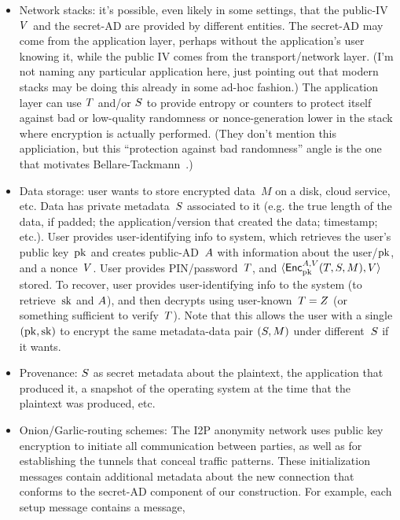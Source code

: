 \begin{itemize}
%
\item Network stacks: it's possible, even likely in some settings, that the public-IV~$V$ and the secret-AD are provided by different entities.  The secret-AD may come from the application layer, perhaps without the application's user knowing it, while the public IV comes from the transport/network layer. (I'm not naming any particular application here, just pointing out that modern stacks may be doing this already in some ad-hoc fashion.)  The application layer can use $T$ and/or $S$ to provide entropy or counters to protect itself against bad or low-quality randomness or nonce-generation lower in the stack where encryption is actually performed. (They don't mention this appliciation, but this ``protection against bad randomness'' angle is the one that motivates Bellare-Tackmann~\cite{BellareTackmann}.)
%
\item Data storage: user wants to store encrypted data~$M$ on a disk, cloud service, etc.  Data has private metadata~$S$ associated to it (e.g. the true length of the data, if padded; the application/version that created the data; timestamp; etc.).  User provides user-identifying info to system, which retrieves the user's public key~$\mathrm{pk}$ and creates public-AD~$A$ with information about the user/$\mathrm{pk}$, and a nonce~$V$.  User provides PIN/password~$T$, and $\langle {\mathsf{Enc}}_{\mathrm{pk}}^{A,V}(T,S,M), V\rangle$ stored.  To recover, user provides user-identifying info to the system (to retrieve~$\mathrm{sk}$ and $A$), and then decrypts using user-known~$T=Z$ (or something sufficient to verify~$T$).  Note that this allows the user with a single $(\mathrm{pk},\mathrm{sk})$ to encrypt the same metadata-data pair $(S,M)$ under different~$S$ if it wants. 
%
\item Provenance: $S$ as secret metadata about the plaintext, the application that produced it, a snapshot of the operating system at the time that the plaintext was produced, etc. 
%
\item Onion/Garlic-routing schemes: The I2P anonymity network uses public key encryption to initiate all communication between parties, as well
as for establishing the tunnels that conceal traffic patterns.  These initialization messages contain additional metadata about the
new connection that conforms to the secret-AD component of our construction.  For example, each setup message contains a message, 

\end{itemize}
